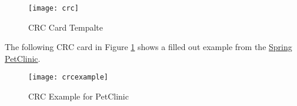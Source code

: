 \begin{figure}[H]
  \center
  \texttt{[image: crc]}
  \caption{CRC Card Tempalte}
\end{figure}

The following CRC card in Figure \ref{fig:crcexample} shows a filled out example from the \href{https://spring-petclinic.github.io/}{Spring PetClinic}.

\begin{figure}[H]
  \center
  \texttt{[image: crcexample]}
  \caption{CRC Example for PetClinic}
  \label{fig:crcexample}
\end{figure}

